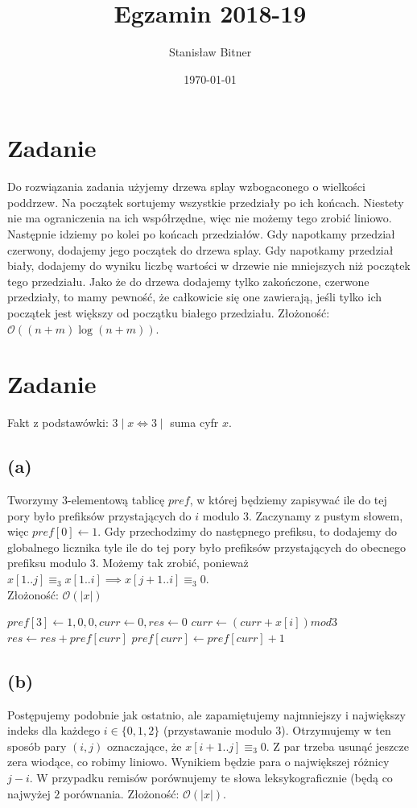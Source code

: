 \documentclass[12pt, a4paper]{article}
\title{Egzamin 2018-19}
\author{Stanisław Bitner}
\date{\today}
\newcommand{\MCALO}{\mathcal{O}}
\newcounter{zadanie}
\newcommand{\zadanie}{\addtocounter{zadanie}{1}\section*{Zadanie \arabic{zadanie}}}
\begin{document}
\maketitle
\zadanie{}
Do rozwiązania zadania użyjemy drzewa splay wzbogaconego o wielkości poddrzew.
Na początek sortujemy wszystkie przedziały po ich końcach. Niestety nie ma
ograniczenia na ich współrzędne, więc nie możemy tego zrobić liniowo. Następnie
idziemy po kolei po końcach przedziałów. Gdy napotkamy przedział czerwony,
dodajemy jego początek do drzewa splay. Gdy napotkamy przedział biały, dodajemy
do wyniku liczbę wartości w drzewie nie mniejszych niż początek tego
przedziału. Jako że do drzewa dodajemy tylko zakończone, czerwone przedziały,
to mamy pewność, że całkowicie się one zawierają, jeśli tylko ich początek jest
większy od początku białego przedziału. Złożoność: $\MCALO((n+m)\log{(n+m)})$.

\zadanie{}
Fakt z podstawówki: $3 \mid x \iff 3 \mid $ suma cyfr $x$.
\subsection*{(a)}
Tworzymy $3$-elementową tablicę $\mathit{pref}$, w której będziemy zapisywać
ile do tej pory było prefiksów przystających do $i$ modulo $3$. Zaczynamy
z pustym słowem, więc $pref[0] \gets 1$. Gdy przechodzimy do następnego
prefiksu, to dodajemy do globalnego licznika tyle ile do tej pory było
prefiksów przystających do obecnego prefiksu modulo $3$. Możemy tak zrobić,
ponieważ $x[1..j] \equiv_3 x[1..i] \implies x[j+1..i] \equiv_3 0$.\\
Złożoność: $\MCALO(|x|)$

\begin{algorithmic}

  \State $pref[3] \gets {1,0,0}, curr \gets 0, res \gets 0$
    \State $curr \gets (curr + x[i]) mod 3$
    \State $res \gets res + pref[curr]$
    \State $pref[curr] \gets pref[curr] + 1$
  \EndFor
\EndFunction

\end{algorithmic}

\subsection*{(b)}
Postępujemy podobnie jak ostatnio, ale zapamiętujemy najmniejszy i największy
indeks dla każdego $i\in\{0,1,2\}$ (przystawanie modulo $3$). Otrzymujemy
w ten sposób pary $(i,j)$ oznaczające, że $x[i+1..j] \equiv_3 0$. Z par trzeba
usunąć jeszcze zera wiodące, co robimy liniowo. Wynikiem będzie para
o największej różnicy $j-i$. W przypadku remisów porównujemy te słowa
leksykograficznie (będą co najwyżej $2$ porównania. Złożoność: $\MCALO(|x|)$.
\end{document}
